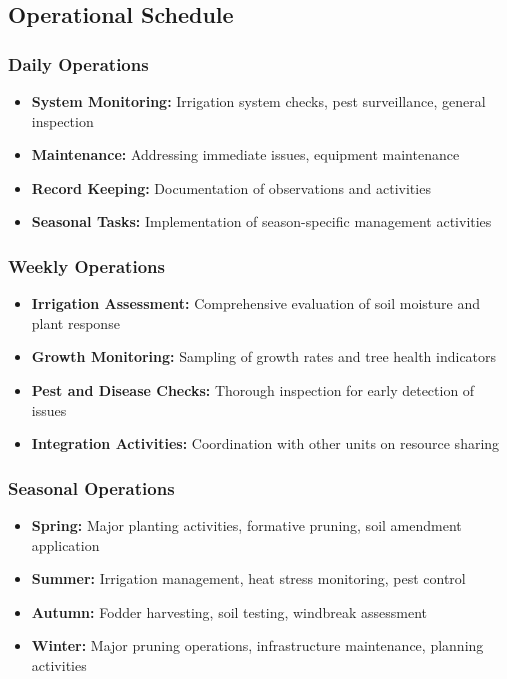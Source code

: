 \subsection{Operational Schedule}

\subsubsection{Daily Operations}
\begin{itemize}
    \item \textbf{System Monitoring:} Irrigation system checks, pest surveillance, general inspection
    \item \textbf{Maintenance:} Addressing immediate issues, equipment maintenance
    \item \textbf{Record Keeping:} Documentation of observations and activities
    \item \textbf{Seasonal Tasks:} Implementation of season-specific management activities
\end{itemize}

\subsubsection{Weekly Operations}
\begin{itemize}
    \item \textbf{Irrigation Assessment:} Comprehensive evaluation of soil moisture and plant response
    \item \textbf{Growth Monitoring:} Sampling of growth rates and tree health indicators
    \item \textbf{Pest and Disease Checks:} Thorough inspection for early detection of issues
    \item \textbf{Integration Activities:} Coordination with other units on resource sharing
\end{itemize}

\subsubsection{Seasonal Operations}
\begin{itemize}
    \item \textbf{Spring:} Major planting activities, formative pruning, soil amendment application
    \item \textbf{Summer:} Irrigation management, heat stress monitoring, pest control
    \item \textbf{Autumn:} Fodder harvesting, soil testing, windbreak assessment
    \item \textbf{Winter:} Major pruning operations, infrastructure maintenance, planning activities
\end{itemize}

